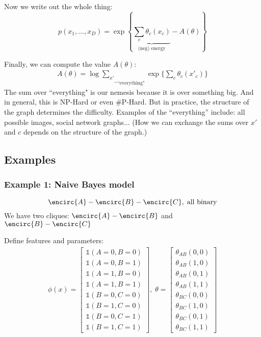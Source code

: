 \documentclass{article}
\begin{document}
Now we write out the whole thing:
\begin{equation}
p(x_1, ..., x_D) = \exp \left\{ \underbrace{ \sum_c \theta_c (x_c) }_{\text{(neg) energy}} - A(\theta) \right\}
\end{equation}

Finally, we can compute the value $A(\theta)$:
\begin{align}
A(\theta) = \log \underbrace{\sum_{x'}}_\text{``everything"} \exp\{ \sum_c \theta_c (x'_c) \}
\end{align}
The sum over ``everything" is our nemesis because it is over something big. And in general, this is NP-Hard or even \#P-Hard. But in practice, the structure of the graph determines the difficulty. Examples of the ``everything'' include: all possible images, social network graphs... (How we can exchange the sums over $x'$ and $c$ depends on the structure of the graph.)

\subsection{Examples}

\subsubsection{Example 1: Naive Bayes model}

\begin{equation}
\encirc{A} - \encirc{B} - \encirc{C}, \; \text{all binary}
\end{equation}
We have two cliques: $\encirc{A}-\encirc{B}$ and $\encirc{B}-\encirc{C}$
\smallskip

Define features and parameters:
\begin{align}
\phi(x) =
	\begin{bmatrix}
		\mathbb{1}(A=0,B=0) \\
		\mathbb{1}(A=0,B=1) \\
		\mathbb{1}(A=1,B=0) \\
		\mathbb{1}(A=1,B=1) \\
		\mathbb{1}(B=0,C=0) \\
		\mathbb{1}(B=1,C=0) \\
		\mathbb{1}(B=0,C=1) \\
		\mathbb{1}(B=1,C=1)
	\end{bmatrix}, \;
\theta  =
	\begin{bmatrix}
	\theta_{AB}(0,0) \\
	\theta_{AB}(1,0) \\
	\theta_{AB}(0,1) \\
	\theta_{AB}(1,1) \\
	\theta_{BC}(0,0) \\
	\theta_{BC}(1,0) \\
	\theta_{BC}(0,1) \\
	\theta_{BC}(1,1)
	\end{bmatrix}
\end{align}
\end{document}
